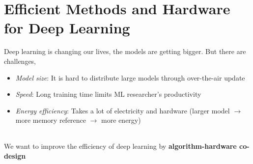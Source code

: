 \section{Efficient Methods and Hardware for Deep Learning}
Deep learning is changing our lives, the models are getting bigger. But there are challenges,
\begin{itemize}
	\item \textit{Model size}: It is hard to distribute large models through over-the-air update
	\item \textit{Speed}: Long training time limits ML researcher's productivity
	\item \textit{Energy efficiency}: Takes a lot of electricity and hardware (larger model $\rightarrow$ more memory reference $\rightarrow$ more energy)
\end{itemize}~
\\
We want to improve the efficiency of deep learning by \textbf{algorithm-hardware co-design}

